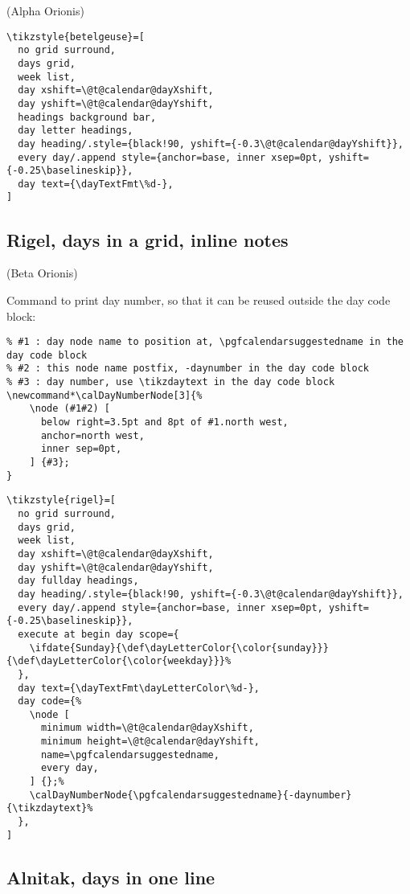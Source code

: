\documentclass[11pt,oneside]{memoir-article}
\begin{document}
(Alpha Orionis)

\begin{verbatim}
\tikzstyle{betelgeuse}=[
  no grid surround,
  days grid,
  week list,
  day xshift=\@t@calendar@dayXshift,
  day yshift=\@t@calendar@dayYshift,
  headings background bar,
  day letter headings,
  day heading/.style={black!90, yshift={-0.3\@t@calendar@dayYshift}},
  every day/.append style={anchor=base, inner xsep=0pt, yshift={-0.25\baselineskip}},
  day text={\dayTextFmt\%d-},
]
\end{verbatim}

\subsection{Rigel, days in a grid, inline notes}
\label{sec:orgb973766}

(Beta Orionis)

Command to print day number, so that it can be reused outside the day code block:

\begin{verbatim}
% #1 : day node name to position at, \pgfcalendarsuggestedname in the day code block
% #2 : this node name postfix, -daynumber in the day code block
% #3 : day number, use \tikzdaytext in the day code block
\newcommand*\calDayNumberNode[3]{%
    \node (#1#2) [
      below right=3.5pt and 8pt of #1.north west,
      anchor=north west,
      inner sep=0pt,
    ] {#3};
}
\end{verbatim}

\begin{verbatim}
\tikzstyle{rigel}=[
  no grid surround,
  days grid,
  week list,
  day xshift=\@t@calendar@dayXshift,
  day yshift=\@t@calendar@dayYshift,
  day fullday headings,
  day heading/.style={black!90, yshift={-0.3\@t@calendar@dayYshift}},
  every day/.append style={anchor=base, inner xsep=0pt, yshift={-0.25\baselineskip}},
  execute at begin day scope={
    \ifdate{Sunday}{\def\dayLetterColor{\color{sunday}}}{\def\dayLetterColor{\color{weekday}}}%
  },
  day text={\dayTextFmt\dayLetterColor\%d-},
  day code={%
    \node [
      minimum width=\@t@calendar@dayXshift,
      minimum height=\@t@calendar@dayYshift,
      name=\pgfcalendarsuggestedname,
      every day,
    ] {};%
    \calDayNumberNode{\pgfcalendarsuggestedname}{-daynumber}{\tikzdaytext}%
  },
]
\end{verbatim}

\subsection{Alnitak, days in one line}
\label{sec:org426a69a}
\end{document}
